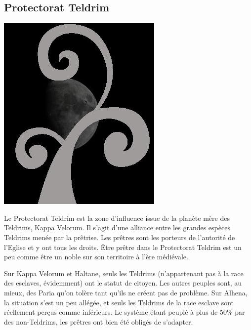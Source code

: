 \begin{multicols}{2}
\section{Protectorat Teldrim}

\begin{center}
\includegraphics[scale=0.2]{Img/logo_teld}
\end{center}

Le Protectorat Teldrim est la zone d'influence issue de la planète mère des Teldrims, Kappa Velorum. Il s'agit d'une alliance entre les grandes espèces Teldrims menée par la prêtrise. Les prêtres sont les porteurs de l'autorité de l'Eglise et y ont tous les droits. Être prêtre dans le Protectorat Teldrim est un peu comme être un noble sur son territoire à l'ère médiévale.

Sur Kappa Velorum et Haltane, seuls les Teldrims (n'appartenant pas à la race des esclaves, évidemment) ont le statut de citoyen. Les autres peuples sont, au mieux, des Paria qu'on tolère tant qu'ils ne créent pas de problème. Sur Alhena, la situation s'est un peu allégée, et seuls les Teldrims de la race esclave sont réellement perçus comme inférieurs. Le système étant peuplé à plus de 50\% par des non-Teldrims, les prêtres ont bien été obligés de s'adapter.


\end{multicols}
